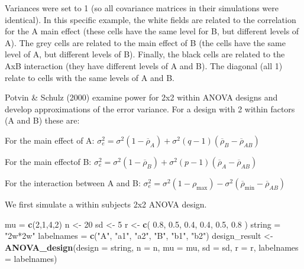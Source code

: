 \documentclass[]{book}
\newenvironment{Shaded}{\begin{snugshade}}{\end{snugshade}}
\newcommand{\DataTypeTok}[1]{\textcolor[rgb]{0.13,0.29,0.53}{#1}}
\newcommand{\DecValTok}[1]{\textcolor[rgb]{0.00,0.00,0.81}{#1}}
\newcommand{\FloatTok}[1]{\textcolor[rgb]{0.00,0.00,0.81}{#1}}
\newcommand{\KeywordTok}[1]{\textcolor[rgb]{0.13,0.29,0.53}{\textbf{#1}}}
\newcommand{\NormalTok}[1]{#1}
\newcommand{\StringTok}[1]{\textcolor[rgb]{0.31,0.60,0.02}{#1}}
\begin{document}
Variances were set to 1 (so all covariance matrices in their simulations were identical). In this specific example, the white fields are related to the correlation for the A main effect (these cells have the same level for B, but different levels of A). The grey cells are related to the main effect of B (the cells have the same level of A, but different levels of B). Finally, the black cells are related to the AxB interaction (they have different levels of A and B). The diagonal (all 1) relate to cells with the same levels of A and B.

Potvin \& Schulz (2000) examine power for 2x2 within ANOVA designs and develop approximations of the error variance. For a design with 2 within factors (A and B) these are:

For the main effect of A:
\(\sigma _ { e } ^ { 2 } = \sigma ^ { 2 } ( 1 - \overline { \rho } _ { A } ) + \sigma ^ { 2 } ( q - 1 ) ( \overline { \rho } _ { B } - \overline { \rho } _ { AB } )\)

For the main effectof B:
\(\sigma _ { e } ^ { 2 } = \sigma ^ { 2 } ( 1 - \overline { \rho } _ { B } ) + \sigma ^ { 2 } ( p - 1 ) ( \overline { \rho } _ { A } - \overline { \rho } _ { A B } )\)

For the interaction between A and B:
\(\sigma _ { e } ^ { 2 } = \sigma ^ { 2 } ( 1 - \rho _ { \max } ) - \sigma ^ { 2 } ( \overline { \rho } _ { \min } - \overline { \rho } _ { AB } )\)

We first simulate a within subjects 2x2 ANOVA design.

\begin{Shaded}
\begin{Highlighting}[]
\NormalTok{mu =}\StringTok{ }\KeywordTok{c}\NormalTok{(}\DecValTok{2}\NormalTok{,}\DecValTok{1}\NormalTok{,}\DecValTok{4}\NormalTok{,}\DecValTok{2}\NormalTok{) }
\NormalTok{n <-}\StringTok{ }\DecValTok{20}
\NormalTok{sd <-}\StringTok{ }\DecValTok{5}
\NormalTok{r <-}\StringTok{ }\KeywordTok{c}\NormalTok{(}
  \FloatTok{0.8}\NormalTok{, }\FloatTok{0.5}\NormalTok{, }\FloatTok{0.4}\NormalTok{,}
       \FloatTok{0.4}\NormalTok{, }\FloatTok{0.5}\NormalTok{,}
            \FloatTok{0.8}
\NormalTok{  )}
\NormalTok{string =}\StringTok{ "2w*2w"}
\NormalTok{labelnames =}\StringTok{ }\KeywordTok{c}\NormalTok{(}\StringTok{"A"}\NormalTok{, }\StringTok{"a1"}\NormalTok{, }\StringTok{"a2"}\NormalTok{, }\StringTok{"B"}\NormalTok{, }\StringTok{"b1"}\NormalTok{, }\StringTok{"b2"}\NormalTok{)}
\NormalTok{design_result <-}\StringTok{ }\KeywordTok{ANOVA_design}\NormalTok{(}\DataTypeTok{design =}\NormalTok{ string,}
                              \DataTypeTok{n =}\NormalTok{ n, }
                              \DataTypeTok{mu =}\NormalTok{ mu, }
                              \DataTypeTok{sd =}\NormalTok{ sd, }
                              \DataTypeTok{r =}\NormalTok{ r, }
                              \DataTypeTok{labelnames =}\NormalTok{ labelnames)}
\end{Highlighting}
\end{Shaded}
\end{document}
